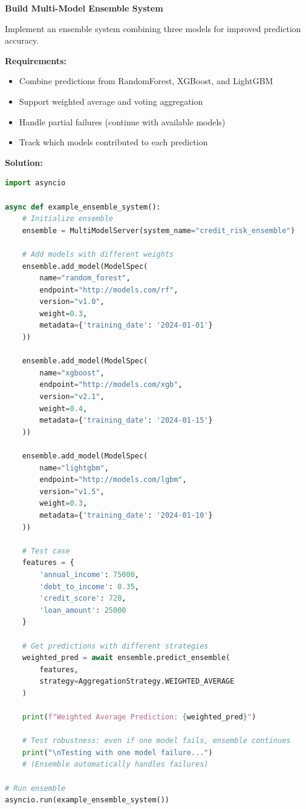 \begin{exercise}
\textbf{Build Multi-Model Ensemble System}

Implement an ensemble system combining three models for improved prediction accuracy.

\textbf{Requirements:}
\begin{itemize}
    \item Combine predictions from RandomForest, XGBoost, and LightGBM
    \item Support weighted average and voting aggregation
    \item Handle partial failures (continue with available models)
    \item Track which models contributed to each prediction
\end{itemize}

\textbf{Solution:}

\begin{lstlisting}[language=Python]
import asyncio

async def example_ensemble_system():
    # Initialize ensemble
    ensemble = MultiModelServer(system_name="credit_risk_ensemble")

    # Add models with different weights
    ensemble.add_model(ModelSpec(
        name="random_forest",
        endpoint="http://models.com/rf",
        version="v1.0",
        weight=0.3,
        metadata={'training_date': '2024-01-01'}
    ))

    ensemble.add_model(ModelSpec(
        name="xgboost",
        endpoint="http://models.com/xgb",
        version="v2.1",
        weight=0.4,
        metadata={'training_date': '2024-01-15'}
    ))

    ensemble.add_model(ModelSpec(
        name="lightgbm",
        endpoint="http://models.com/lgbm",
        version="v1.5",
        weight=0.3,
        metadata={'training_date': '2024-01-10'}
    ))

    # Test case
    features = {
        'annual_income': 75000,
        'debt_to_income': 0.35,
        'credit_score': 720,
        'loan_amount': 25000
    }

    # Get predictions with different strategies
    weighted_pred = await ensemble.predict_ensemble(
        features,
        strategy=AggregationStrategy.WEIGHTED_AVERAGE
    )

    print(f"Weighted Average Prediction: {weighted_pred}")

    # Test robustness: even if one model fails, ensemble continues
    print("\nTesting with one model failure...")
    # (Ensemble automatically handles failures)

# Run ensemble
asyncio.run(example_ensemble_system())
\end{lstlisting}
\end{exercise}
